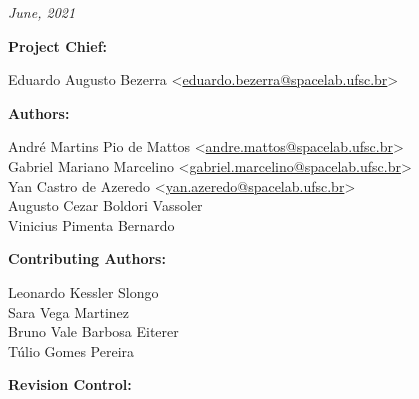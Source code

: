 %
%
%
%
%

%
%
%
%
%
%

\thispagestyle{empty}

\begin{center}

\textbf{\thetitle}

\textit{June, 2021}

\vspace{1cm}

\textbf{Project Chief:}

Eduardo Augusto Bezerra <\href{mailto:eduardo.bezerra@spacelab.ufsc.br}{eduardo.bezerra@spacelab.ufsc.br}>

\vspace{1cm}

\textbf{Authors:}

André Martins Pio de Mattos <\href{mailto:andre.mattos@spacelab.ufsc.br}{andre.mattos@spacelab.ufsc.br}>\\
Gabriel Mariano Marcelino <\href{mailto:gabriel.marcelino@spacelab.ufsc.br}{gabriel.marcelino@spacelab.ufsc.br}>\\
Yan Castro de Azeredo <\href{mailto:yan.azeredo@spacelab.ufsc.br}{yan.azeredo@spacelab.ufsc.br}>\\
Augusto Cezar Boldori Vassoler \\ 
Vinicius Pimenta Bernardo \\

\vspace{1cm}

\textbf{Contributing Authors:}

Leonardo Kessler Slongo \\
Sara Vega Martinez \\
Bruno Vale Barbosa Eiterer \\
Túlio Gomes Pereira \\

\vspace{1cm}


\textbf{Revision Control:}

\end{center}

